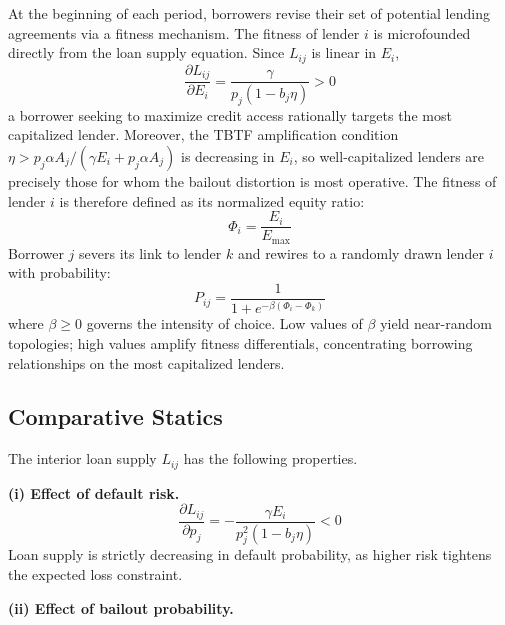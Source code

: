 \documentclass{article}
\begin{document}
At the beginning of each period, borrowers revise their set of potential lending
agreements via a fitness mechanism. The fitness of lender $i$ is microfounded directly
from the loan supply equation. Since $L_{ij}$ is linear in $E_i$,
\begin{equation}
    \frac{\partial L_{ij}}{\partial E_{i}} = \frac{\gamma}{p_{j}(1 - b_{j}\eta)} > 0
\end{equation}
a borrower seeking to maximize credit access rationally targets the most capitalized
lender. Moreover, the TBTF amplification condition $\eta > p_j\alpha A_j /
(\gamma E_i + p_j \alpha A_j)$ is decreasing in $E_i$, so well-capitalized lenders
are precisely those for whom the bailout distortion is most operative. The fitness of
lender $i$ is therefore defined as its normalized equity ratio:
\begin{equation}
    \Phi_{i} = \frac{E_{i}}{E_{\max}}
\end{equation}
Borrower $j$ severs its link to lender $k$ and rewires to a randomly drawn lender $i$
with probability:
\begin{equation}
    P_{ij} = \frac{1}{1 + e^{-\beta(\Phi_{i} - \Phi_{k})}}
\end{equation}
where $\beta \geq 0$ governs the intensity of choice. Low values of $\beta$ yield
near-random topologies; high values amplify fitness differentials, concentrating
borrowing relationships on the most capitalized lenders.





\subsection{Comparative Statics}

The interior loan supply $L_{ij}$ has the following properties.

\medskip
\noindent\textbf{(i) Effect of default risk.}
\begin{equation}
    \frac{\partial L_{ij}}{\partial p_{j}} = -\frac{\gamma E_{i}}{p_{j}^{2}(1 - b_{j}\eta)} < 0
\end{equation}
Loan supply is strictly decreasing in default probability, as higher risk tightens
the expected loss constraint.

\medskip
\noindent\textbf{(ii) Effect of bailout probability.}
\end{document}
